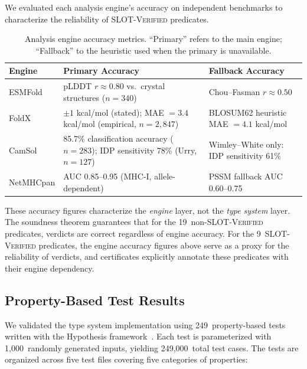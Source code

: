 We evaluated each analysis engine's accuracy on independent benchmarks to
characterize the reliability of SLOT-\textsc{Verified} predicates.

\begin{table}[t]
\centering
\caption{Analysis engine accuracy metrics.  ``Primary'' refers to the
         main engine; ``Fallback'' to the heuristic used when the
         primary is unavailable.}
\label{tab:engineaccuracy}
\begin{tabular}{llp{4.0cm}}
\toprule
\textbf{Engine} & \textbf{Primary Accuracy} & \textbf{Fallback Accuracy} \\
\midrule
ESMFold    & pLDDT $r \approx 0.80$ vs.\ crystal structures ($n = 340$) &
             Chou--Fasman $r \approx 0.50$ \\
FoldX      & $\pm 1$ kcal/mol (stated); MAE $= 3.4$ kcal/mol (empirical, $n = 2{,}847$) &
             BLOSUM62 heuristic MAE $= 4.1$ kcal/mol \\
CamSol     & 85.7\% classification accuracy ($n = 283$); IDP sensitivity 78\% (Urry, $n = 127$) &
             Wimley--White only: IDP sensitivity 61\% \\
NetMHCpan  & AUC 0.85--0.95 (MHC-I, allele-dependent) &
             PSSM fallback AUC 0.60--0.75 \\
\bottomrule
\end{tabular}
\end{table}

These accuracy figures characterize the \emph{engine} layer, not the
\emph{type system} layer.  The soundness theorem guarantees that for the
19~non-SLOT-\textsc{Verified} predicates, \PASS{} verdicts are correct
regardless of engine accuracy.  For the 9~SLOT-\textsc{Verified}
predicates, the engine accuracy figures above serve as a proxy for the
reliability of \PASS{} verdicts, and certificates explicitly annotate
these predicates with their engine dependency.

\subsection{Property-Based Test Results}\label{sec:pbt}

We validated the type system implementation using 249~property-based
tests written with the Hypothesis framework~\cite{maciver2019hypothesis}.
Each test is parameterized with 1,000~randomly generated inputs, yielding
249,000~total test cases.  The tests are organized across five test
files covering five categories of properties:

